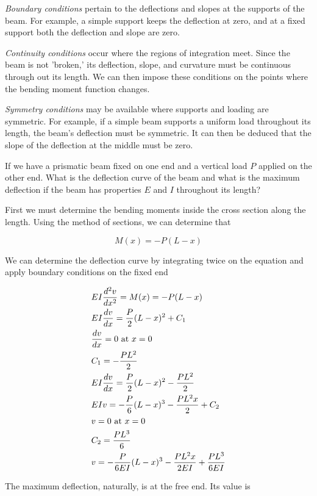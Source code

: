 \documentclass[a4paper,openany,nobib]{tufte-book}
\begin{document}
\begin{enumerate}
\emph{Boundary conditions} pertain to the deflections and slopes at the
supports of the beam. For example, a simple support keeps the deflection
at zero, and at a fixed support both the deflection and slope are zero.

\emph{Continuity conditions} occur where the regions of integration meet.
Since the beam is not 'broken,' its deflection, slope, and curvature
must be continuous through out its length. We can then impose these
conditions on the points where the bending moment function changes.

\emph{Symmetry conditions} may be available where supports and loading are
symmetric. For example, if a simple beam supports a uniform load
throughout its length, the beam's deflection must be symmetric. It can
then be deduced that the slope of the deflection at the middle must be
zero.

If we have a prismatic beam fixed on one end and a vertical load \(P\)
applied on the other end. What is the deflection curve of the beam and
what is the maximum deflection if the beam has properties \(E\) and \(I\)
throughout its length?


First we must determine the bending moments inside the cross section
along the length. Using the method of sections, we can determine that

$$M(x) =  - P(L - x)$$

We can determine the deflection curve by integrating twice on the
equation and apply boundary conditions on the fixed end

$$\begin{gathered}
  EI\frac{d^2v}{dx^2} = M(x) =  - P(L - x) \hfill \\
  EI\frac{dv}{dx} = \frac{P}{2}(L - x)^2 + C_1 \hfill \\
  \frac{dv}{dx} = 0\text{ at }x = 0 \hfill \\
  C_1 =  -\frac{PL^2}{2} \hfill \\
  EI\frac{dv}{dx} = \frac{P}{2}(L - x)^2 - \frac{PL^2}{2} \hfill \\
  EIv =  -\frac{P}{6}(L - x)^3 -\frac{PL^2x}{2} + C_2 \hfill \\
  v = 0\text{ at }x = 0 \hfill \\
  C_2 = \frac{PL^3}{6} \hfill \\
  v =  -\frac{P}{6EI}(L - x)^3 -\frac{PL^2x}{2EI} + \frac{PL^3}{6EI} \hfill \\ 
\end{gathered}$$

The maximum deflection, naturally, is at the free end. Its value is


\end{enumerate}
\end{document}
